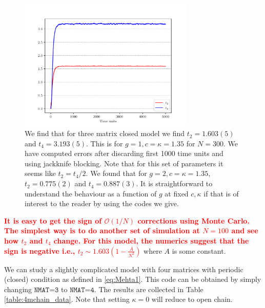 \documentclass[11pt]{article}
\newcommand{\TODO}[1]{\textcolor{red}{{\bf #1}}}
\begin{document}
\begin{figure}[htbp] 
	\centering 
	\includegraphics[width=0.75\textwidth]{figs/3MM_closed.pdf}
	\caption{\label{fig:3MM_closed}We find that for three matrix closed model we find $t_{2} = 1.603(5)$ and $t_{4} = 3.193(5)$. 
	This is for $g=1, c=\kappa=1.35$ for $N=300$. We have computed errors after discarding first 1000 time units and 
	using jackknife blocking. Note that for this set of parameters it seems like $t_{2} = t_{4}/2$. We found that 
	for $g=2, c=\kappa=1.35$, $t_{2} = 0.775(2)$ and $t_{4} = 0.887(3)$. It is straightforward to understand the behaviour as a function of $g$ at fixed $c, \kappa$ if that is of interest to the reader by using the codes we give.}
\end{figure}

\TODO{It is easy to get the sign of $\mathcal{O}(1/N)$ corrections using Monte Carlo. 
The simplest way is to do another set of simulation at $N = 100$ and see how $t_{2}$ and 
$t_{4}$ change. For this model, the numerics suggest that the sign is negative
i.e., $t_{2} \sim 1.603(1 - \frac{A}{N^2})$} where $A$ is some constant. 


We can study a slightly complicated model with four matrices with periodic (closed) condition as defined in \ref{eq:Mehta1}.
This code can be obtained by simply changing $\texttt{NMAT=3}$ to  $\texttt{NMAT=4}$. 
The results are collected in Table \ref{table:4mchain_data}. Note that setting $\kappa=0$ will reduce to open chain.        

\end{document}
